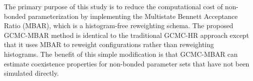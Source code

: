 \documentclass[journal=jced,manuscript=article]{achemso}
\begin{document}




The primary purpose of this study is to reduce the computational cost of non-bonded parameterization by implementing the Multistate Bennett Acceptance Ratio (MBAR), \cite{chodera:jctc:2007,shirts-chodera:jcp:2008:mbar} which is a histogram-free reweighting schema. The proposed GCMC-MBAR method is identical to the traditional GCMC-HR approach except that it uses MBAR to reweight configurations rather than reweighting histograms. The benefit of this simple modification is that GCMC-MBAR can estimate coexistence properties for non-bonded parameter sets that have not been simulated directly. 
\end{document}
